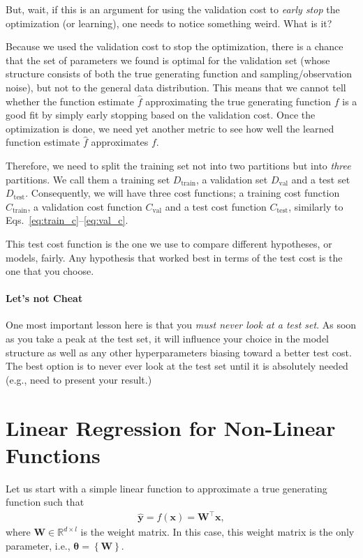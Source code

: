 \documentclass{report}
\newcommand{\vect}[1]{\mathbf{#1}}
\newcommand{\vects}[1]{\boldsymbol{#1}}
\newcommand{\matr}[1]{\mathbf{#1}}
\newcommand{\vx}[0]{\vect{x}}
\newcommand{\vy}[0]{\vect{y}}
\newcommand{\mW}[0]{\matr{W}}
\newcommand{\TT}[0]{\vects{\theta}}
\newcommand{\RR}[0]{\mathbb{R}}
\newcommand{\train}{\text{train}}
\newcommand{\val}{\text{val}}
\newcommand{\test}{\text{test}}
\begin{document}
But, wait, if this is an argument for using the validation cost to {\em early
stop} the optimization (or learning), one needs to notice something weird. What
is it?

Because we used the validation cost to stop the optimization, there is a chance
that the set of parameters we found is optimal for the validation set (whose
structure consists of both the true generating function and sampling/observation
noise), but not to the general data distribution. This means that we cannot tell
whether the function estimate $\hat{f}$ approximating the true generating
function $f$ is a good fit by simply early stopping based on the validation
cost.  Once the optimization is done, we need yet another metric to see how well
the learned function estimate $\hat{f}$ approximates $f$.

Therefore, we need to split the training set not into two partitions but into
{\em three} partitions. We call them a training set $D_{\train}$, a validation
set $D_{\val}$ and a test set $D_{\test}$. Consequently, we will have three cost
functions; a training cost function $C_{\train}$, a validation cost function
$C_{\val}$ and a test cost function $C_{\test}$, similarly to
Eqs.~\ref{eq:train_c}--\ref{eq:val_c}.

This test cost function is the one we use to compare different hypotheses, or
models, fairly. Any hypothesis that worked best in terms of the test cost is the
one that you choose.

\paragraph{Let's not Cheat}
One most important lesson here is that you {\em must never look at a test set}.
As soon as you take a peak at the test set, it will influence your choice in the
model structure as well as any other hyperparameters biasing toward a better
test cost. The best option is to never ever look at the test set until it is
absolutely needed (e.g., need to present your result.)

\section{Linear Regression for Non-Linear Functions}

Let us start with a simple linear function to approximate a true generating
function such that
\begin{align*}
    \hat{\vy} = f(\vx) = \mW^\top \vx, 
\end{align*}
where $\mW \in \RR^{d \times l}$ is the weight matrix. In this case, this weight
matrix is the only parameter, i.e., $\TT=\left\{ \mW \right\}$.
\end{document}
